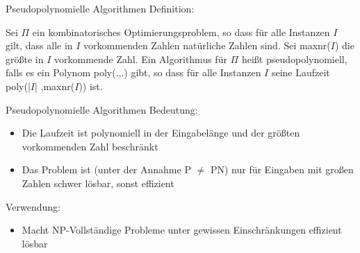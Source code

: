 \begin{frame}{Pseudopolynomielle Algorithmen}
Definition:

Sei $\Pi$ ein kombinatorisches Optimierungsproblem, so dass für alle Instanzen $I$ gilt, dass alle in $I$ vorkommenden Zahlen natürliche Zahlen sind. Sei maxnr($I$) die größte in $I$ vorkommende Zahl. Ein Algorithmus für $\Pi$ heißt pseudopolynomiell, falls es ein Polynom poly(.,.)  gibt, so 
dass für alle Instanzen $I$ seine Laufzeit poly(|$I$| ,maxnr($I$)) ist. 

\end{frame}
\begin{frame}{Pseudopolynomielle Algorithmen}
Bedeutung:

\begin{itemize}
\item
Die Laufzeit ist polynomiell in der Eingabelänge und der größten vorkommenden Zahl beschränkt

\item
Das Problem ist (unter der Annahme P $\neq$ PN) nur für Eingaben mit großen Zahlen schwer lösbar, sonst effizient

\end{itemize}

Verwendung:
\begin{itemize}
\item
Macht NP-Vollständige Probleme unter gewissen Einschränkungen effizient lösbar

\end{itemize}
\end{frame}
